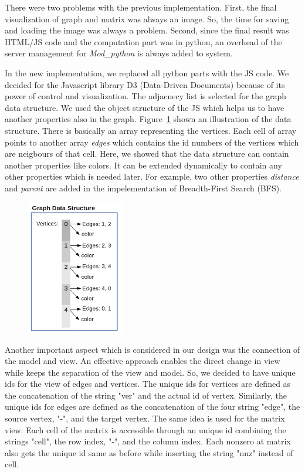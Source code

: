 \documentclass[12pt, oneside]{book}
\begin{document}
There were two problems with the previous implementation. First, the final visualization
of graph and matrix was always an image. 
So, the time for saving and loading the image was always a problem.
Second, since the final result was HTML/JS code and the computation part was in python,
an overhead of the server management for \textit{Mod\_python} is always added to system.

In the new implementation, we replaced all python parts with the JS code.
We decided for the Javascript library D3 (Data-Driven Documents) 
because of its power of control and visualization.
The adjacnecy list is selected for the graph data structure.
We used the object structure of the JS which helps us to have another
properties also in the graph. Figure~\ref{f.graph-ds} shown an illustration
of the data structure. There is basically an array representing the vertices.
Each cell of array points to another array \textit{edges} which contains
the id numbers of the vertices which are neigbours of that cell.
Here, we showed that the data structure can contain another properties like colors.
It can be extended dynamically to contain any other properties which is needed later.
For example, two other properties \textit{distance} and \textit{parent} are added
in the impelementation of Breadth-First Search (BFS).

\begin{figure}
\centering
\includegraphics[width=0.38\textwidth]{graph}
\caption{}
\label{f.graph-ds}
\end{figure}

Another important aspect which is considered in our design was the connection of the 
model and view. An effective approach enables the direct change in view while keeps the 
separation of the view and model. So, we decided to have unique ids for the view of
edges and vertices. The unique ids for vertices are defined as the concatenation of the
string "ver" and the actual id of vertex. Similarly, the unique ids for edges are
defined as the concatenation of the four string "edge", the source vertex, "-", 
and the target vertex. The same idea is used for the matrix view. Each cell of the matrix
is accessible through an unique id combining the strings "cell", the row index,
"-", and the column index. Each nonzero at matrix also gets the unique id same as before 
while inserting the string "nnz" instead of cell.
\end{document}
